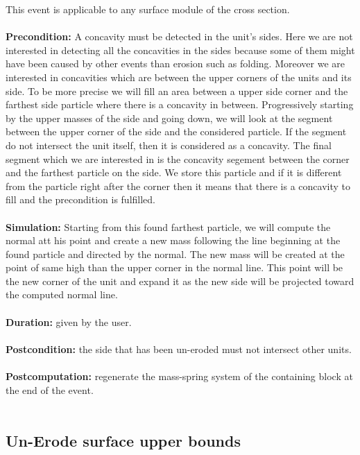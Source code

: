 \documentclass[12pt, a4paper]{memoir} %
\begin{document}
This event is applicable to any surface module of the cross section.\\\\
\textbf{Precondition:} A concavity must be detected in the unit's sides. Here we are not interested in detecting all the concavities in the sides because some of them might have been caused by other events than erosion such as folding. Moreover we are interested in concavities which are between the upper corners of the units and its side. To be more precise we will fill an area between a upper side corner and the farthest side particle where there is a concavity in between. Progressively starting by the upper masses of the side and going down, we will look at the segment between the upper corner of the side and the considered particle. If the segment do not intersect the unit itself, then it is considered as a concavity. The final segment which we are interested in is the concavity segement between the corner and the farthest particle on the side. We store this particle and if it is different from the particle right after the corner then it means that there is a concavity to fill and the precondition is fulfilled.\\\\
\textbf{Simulation:}  Starting from this found farthest particle, we will compute the normal att his point and create a new mass following the line beginning at the found particle and directed by the normal. The new mass will be created at the point of same high than the upper corner in the normal line. This point will be the new corner of the unit and expand it as the new side will be projected toward the computed normal line.\\\\
\textbf{Duration:} given by the user.\\\\
\textbf{Postcondition:} the side that has been un-eroded must not intersect other units.\\\\
\textbf{Postcomputation:} regenerate the mass-spring system of the containing block at the end of the event.\\\\

\subsection{Un-Erode surface upper bounds}
\end{document}

